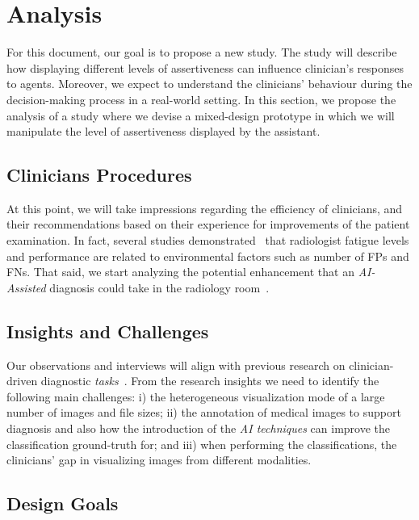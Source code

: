 \section{Analysis}
\label{sec:sec003}

For this document, our goal is to propose a new study.
The study will describe how displaying different levels of assertiveness can influence clinician's responses to agents.
Moreover, we expect to understand the clinicians' behaviour during the decision-making process in a real-world setting.
In this section, we propose the analysis of a study where we devise a mixed-design prototype in which we will manipulate the level of assertiveness displayed by the assistant.

\subsection{Clinicians Procedures}
\label{sec:sec00301}

At this point, we will take impressions regarding the efficiency of clinicians, and their recommendations based on their experience for improvements of the patient examination.
In fact, several studies demonstrated~\cite{waite2017tired} that radiologist fatigue levels and performance are related to environmental factors such as number of FPs and FNs.
That said, we start analyzing the potential enhancement that an {\it AI-Assisted} diagnosis could take in the radiology room~\cite{chatelain2018evaluation, miglioretti2007radiologist}.

\subsection{Insights and Challenges}
\label{sec:sec00302}

Our observations and interviews will align with previous research on clinician-driven diagnostic {\it tasks}~\cite{Sultanum:2018:MTP:3173574.3173996}.
From the research insights we need to identify the following main challenges:
i) the heterogeneous visualization mode of a large number of images and file sizes;
ii) the annotation of medical images to support diagnosis and also 
how the introduction of the {\it AI techniques} can improve the classification ground-truth for; and
iii) when performing the classifications, the clinicians' gap in visualizing images from different modalities.

\subsection{Design Goals}
\label{sec:sec00303}

